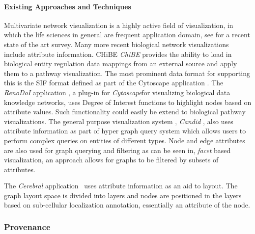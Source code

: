 \paragraph*{Existing Approaches and Techniques}
Multivariate network visualization is a highly active field of visualization, in which the life sciences in general are frequent application domain, see \cite{} for a recent state of the art survey.
Many more recent biological network visualizations include attribute information.
CHiBE \textit{ChiBE}\cite{Babur2010chibe} provides the ability to load in biological entity regulation data mappings from an external source and apply them to a pathway visualization.
The most prominent data format for supporting this is the SIF format defined as part of the Cytoscape application \cite{Shannon2003cytoscape}.
The \textit{RenoDoI} application \cite{Vehlow2015}, a plug-in for \textit{Cytoscape}for visualizing biological data knowledge networks, uses Degree of Interest functions to highlight nodes based on attribute values.
Such functionality could easily be extend to biological pathway visualizations.
The general purpose visualization system , \textit{Candid} \cite{Shadoan2013}, also uses attribute information as part of hyper graph query system which allows users to perform complex queries on entities of different types.
Node and edge attributes are also used for graph querying and filtering as can be seen in, \textit{facet} based visualization, an approach allows for graphs to be filtered by subsets of attributes.

The \textit{Cerebral} application~\cite{Barsky2008cerebral} uses attribute information as an aid to layout. The graph layout space is divided into layers and nodes are positioned in the layers based  on sub-cellular localization annotation, essentially an attribute of the node.

\subsubsection*{Provenance}

